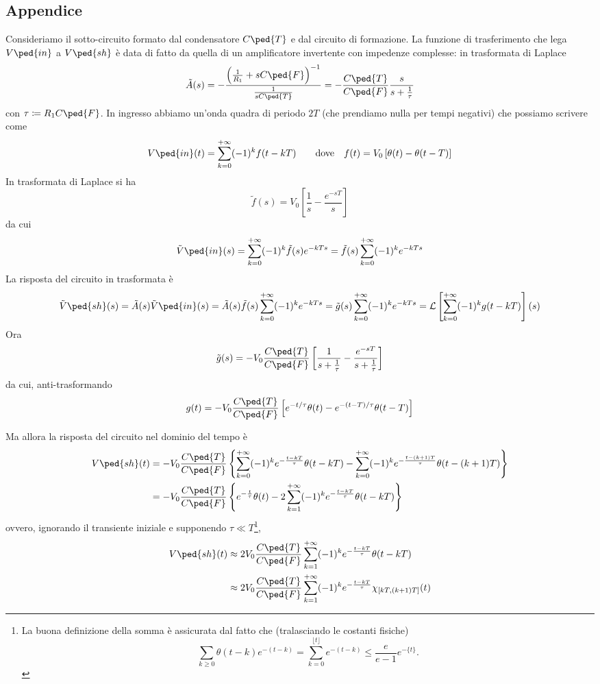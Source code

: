 \documentclass[10pt,a4paper]{article}
\begin{document}
\subsection*{Appendice}
Consideriamo il sotto-circuito formato dal condensatore $ C\ped{T} $ e dal 
circuito di formazione. La funzione di trasferimento che lega $ 
V\ped{in} $ a $ V\ped{sh} $ è data di fatto da quella di un amplificatore 
invertente con impedenze complesse: in trasformata di Laplace
\[
\tilde{A}(s) = - \frac{\left(\frac{1}{R_{1}} + s 
C\ped{F}\right)^{-1}}{\frac{1}{s C\ped{T}}} = - \frac{C\ped{T}}{C\ped{F}} 
\frac{s}{s + \frac{1}{\tau}}
\]
con $ \tau \coloneqq R_{1} C\ped{F} $. In ingresso abbiamo un'onda quadra di 
periodo $ 2T $ (che prendiamo nulla per tempi negativi) che possiamo scrivere 
come
\[
V\ped{in}(t) = \sum_{k=0}^{+\infty} (-1)^{k}f(t - kT)
\qquad \text{dove} \quad
f(t) = V_{0} \left[\theta(t) - \theta(t - T)\right]
\]
In trasformata di Laplace si ha
\[
\tilde{f}(s) = V_{0}\left[\frac{1}{s} - \frac{e^{-sT}}{s}\right]
\]
da cui
\[
\tilde{V}\ped{in}(s) = \sum_{k=0}^{+\infty} (-1)^{k} \tilde{f}(s) e^{-kTs} = 
\tilde{f}(s) \sum_{k=0}^{+\infty} (-1)^{k} e^{-kTs}
\]
La risposta del circuito in trasformata è
\[
  \tilde{V}\ped{sh}(s) = \tilde{A}(s) \tilde{V}\ped{in}(s) =  
\tilde{A}(s)\tilde{f}(s) \sum_{k=0}^{+\infty} (-1)^{k}e^{-kTs} = \tilde{g}(s) 
\sum_{k=0}^{+\infty} (-1)^{k}e^{-kTs} = \mathcal{L}\left[\sum_{k=0}^{+\infty} 
(-1)^{k}g(t - kT)\right](s)
\]
Ora
\[
  \tilde{g}(s) = - V_{0} \frac{C\ped{T}}{C\ped{F}} \left[\frac{1}{s + 
\frac{1}{\tau}} - \frac{e^{-sT}}{s + \frac{1}{\tau}}\right]
\]
da cui, anti-trasformando
\[
  g(t) = - V_{0} \frac{C\ped{T}}{C\ped{F}} \left[e^{-t/\tau}\theta(t) - 
e^{-(t-T)/\tau} \theta(t - T) \right]
\]

Ma allora la risposta del circuito nel dominio del tempo è
\begin{align*}
  V\ped{sh}(t) &= - V_{0} \frac{C\ped{T}}{C\ped{F}} \left\{ 
\sum_{k=0}^{+\infty} (-1)^{k}e^{-\frac{t - kT}{\tau}}\theta(t - kT) - 
\sum_{k=0}^{+\infty} (-1)^{k} e^{-\frac{t- (k+1) T }{\tau}} \theta(t - (k+1)T ) 
\right\} \\
               &= - V_{0} \frac{C\ped{T}}{C\ped{F}} \left\{ e^{-\frac{t}{\tau}} 
\theta(t) - 2 \sum_{k=1}^{+\infty} (-1)^{k} e^{-\frac{t - kT}{\tau}} \theta(t - 
kT) \right\}
\end{align*}
ovvero, ignorando il transiente iniziale e supponendo $ \tau\ll T $\footnote{
La buona definizione della somma è assicurata dal fatto che (tralasciando le 
costanti fisiche)
\[ \sum_{k \geq 0} \theta(t-k) e^{-(t-k)} = \sum_{k=0}^{\lfloor t \rfloor} 
e^{-(t-k)} \leq \frac{e}{e-1} e^{-\{t\}}. \]
},
\begin{align}\label{eq:Vshaper}
V\ped{sh}(t) &\approx 2 V_{0} \frac{C\ped{T}}{C\ped{F}} \sum_{k=1}^{+\infty} 
(-1)^{k} e^{-\frac{t - kT}{\tau}} \theta(t - kT) \nonumber\\
               &\approx  2 V_{0} \frac{C\ped{T}}{C\ped{F}} \sum_{k=1}^{+\infty} 
(-1)^{k} e^{-\frac{t - kT}{\tau}} \chi_{[kT, (k+1)T]}(t)
\end{align}
\end{document}
